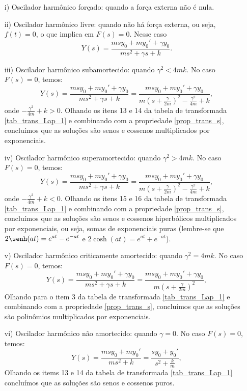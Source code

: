 \begin{itemize}
 \item[i)] Oscilador harmônico forçado: quando a força externa não é nula.
 \item[ii)] Oscilador harmônico livre: quando não há força externa, ou seja, $f(t)=0$, o que implica em $F(s)=0$. Nesse caso
\begin{equation}
Y(s)=\frac{msy_0+my_0'+\gamma y_0}{ms^2+\gamma s +k}.
\end{equation}
\item[iii)] Oscilador harmônico subamortecido: quando $\gamma^2< 4mk$. No caso $F(s)=0$, temos:
\begin{equation}
Y(s)=\frac{msy_0+my_0'+\gamma y_0}{ms^2+\gamma s +k}=\frac{msy_0+my_0'+\gamma y_0}{m\left(s+\frac{\gamma}{2m}\right)^2-\frac{\gamma^2}{4m} +k},
\end{equation}
onde $-\frac{\gamma^2}{4m} +k>0$. Olhando os itens 13 e 14 da tabela de transformada \ref{tab_trans_Lap_1} e combinando com a propriedade \ref{prop_trans_s}, concluímos que as soluções são senos e cossenos multiplicados por exponenciais.
\item[iv)] Oscilador harmônico superamortecido: quando $\gamma^2> 4mk$. No caso $F(s)=0$, temos:
\begin{equation}
Y(s)=\frac{msy_0+my_0'+\gamma y_0}{ms^2+\gamma s +k}=\frac{msy_0+my_0'+\gamma y_0}{m\left(s+\frac{\gamma}{2m}\right)^2-\frac{\gamma^2}{4m} +k},
\end{equation}
onde $-\frac{\gamma^2}{4m} +k<0$. Olhando os itens 15 e 16 da tabela de transformada \ref{tab_trans_Lap_1} e combinando com a propriedade \ref{prop_trans_s}, concluímos que as soluções são senos e cossenos hiperbólicos multiplicados por exponenciais, ou seja, somas de exponenciais puras (lembre-se que $\displaystyle 2\senh(at)=e^{at}-e^{-at}$ e $\displaystyle2\cosh(at)=e^{at}+e^{-at}$).
\item[v)] Oscilador harmônico criticamente amortecido: quando $\gamma^2= 4mk$. No caso $F(s)=0$, temos:
\begin{equation}
Y(s)=\frac{msy_0+my_0'+\gamma y_0}{ms^2+\gamma s +k}=\frac{msy_0+my_0'+\gamma y_0}{m\left(s+\frac{\gamma}{2m}\right)^2},
\end{equation}
Olhando para o item 3 da tabela de transformada \ref{tab_trans_Lap_1} e combinando com a propriedade \ref{prop_trans_s}, concluímos que as soluções são polinômios multiplicados por exponenciais.
\item[vi)] Oscilador harmônico não amortecido: quando $\gamma= 0$. No caso $F(s)=0$, temos:
\begin{equation}
Y(s)=\frac{msy_0+my_0'}{ms^2 +k}=\frac{sy_0+y_0'}{s^2+\frac{k}{m}},
\end{equation}
Olhando os items 13 e 14 da tabela de transformada \ref{tab_trans_Lap_1} concluímos que as soluções são senos e cossenos puros.
\end{itemize}
